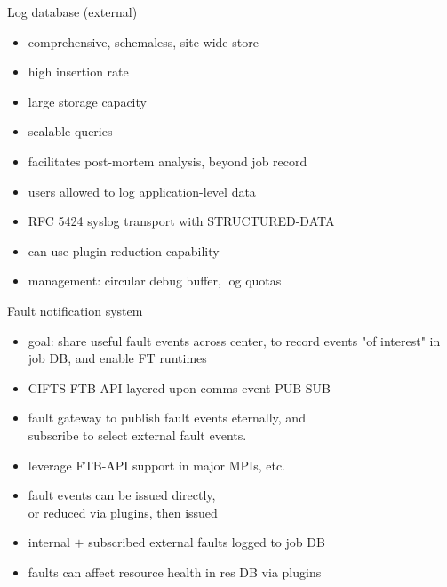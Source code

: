 \documentclass[default,pdf,colorBG,slideColor]{prosper}
\begin{document}
\begin{slide}{Log database (external)}{\small
\begin{minipage}[b]{0.55\linewidth}
\begin{itemize}
  \item{comprehensive, schemaless, site-wide store}
  \item{high insertion rate}
\end{itemize}
\end{minipage}
\hfill
\begin{minipage}[b]{0.40\linewidth}
\begin{center}
\end{center}
\end{minipage}
\hfill
\begin{itemize}
  \item{large storage capacity}
  \item{scalable queries}
  \item{facilitates post-mortem analysis, beyond job record}
  \item{users allowed to log application-level data}
  \item{RFC 5424 syslog transport with STRUCTURED-DATA}
  \item{can use plugin reduction capability}
  \item{management: circular debug buffer, log quotas}
\end{itemize}
}\end{slide}
\begin{slide}{Fault notification system}{\small
\begin{itemize}
  \item{goal: share useful fault events across center, to record events
       "of interest" in job DB, and enable FT runtimes}
  \item{CIFTS FTB-API layered upon comms event PUB-SUB}
  \item{fault gateway to publish fault events eternally, and\\
	subscribe to select external fault events.}
  \item{leverage FTB-API support in major MPIs, etc.}
  \item{fault events can be issued directly,\\
	or reduced via plugins, then issued}
  \item{internal $+$ subscribed external faults logged to job DB}
  \item{faults can affect resource health in res DB via plugins}
\end{itemize}
}\end{slide}
\end{document}
